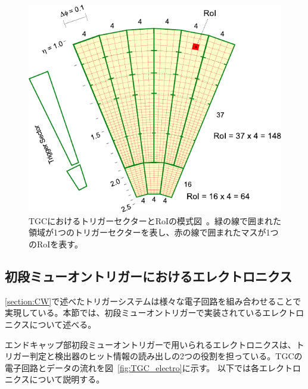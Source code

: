 \begin{figure}[tb]
  \centering
  \includegraphics[clip, width=13cm]{fig/3/RoI.pdf}
  \caption{TGCにおけるトリガーセクターとRoIの模式図~\cite{article:phase1}。緑の線で囲まれた領域が1つのトリガーセクターを表し、赤の線で囲まれたマスが1つのRoIを表す。}
  \label{fig:RoI}
\end{figure}



\newpage
\subsection{初段ミューオントリガーにおけるエレクトロニクス}
\ref{section:CW}で述べたトリガーシステムは様々な電子回路を組み合わせることで実現している。本節では、初段ミューオントリガーで実装されているエレクトロニクスについて述べる。

エンドキャップ部初段ミューオントリガーで用いられるエレクトロニクスは、トリガー判定と検出器のヒット情報の読み出しの2つの役割を担っている。TGCの電子回路とデータの流れを図~\ref{fig:TGC_electro}に示す。
以下では各エレクトロニクスについて説明する。

